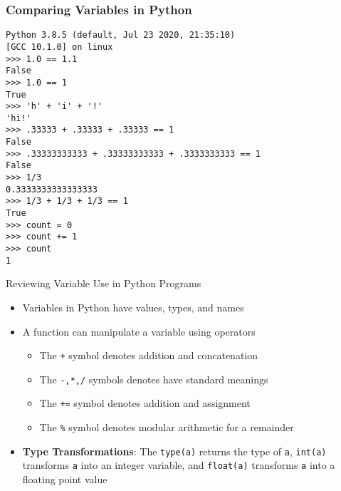\documentclass[14pt,aspectratio=169]{beamer}
\begin{document}
%
\begin{frame}[fragile]
  \frametitle{Comparing Variables in Python}
  \normalsize
  \hspace*{.05in}
  \begin{minipage}{6in}
    \vspace*{-.10in}
    \begin{verbatim}
Python 3.8.5 (default, Jul 23 2020, 21:35:10)
[GCC 10.1.0] on linux
>>> 1.0 == 1.1
False
>>> 1.0 == 1
True
>>> 'h' + 'i' + '!'
'hi!'
>>> .33333 + .33333 + .33333 == 1
False
>>> .33333333333 + .33333333333 + .3333333333 == 1
False
>>> 1/3
0.3333333333333333
>>> 1/3 + 1/3 + 1/3 == 1
True
>>> count = 0
>>> count += 1
>>> count
1
    \end{verbatim}
  \end{minipage}
\end{frame}

%
\begin{frame}{Reviewing Variable Use in Python Programs}
  \begin{itemize}
    \item Variables in Python have values, types, and names
      \vspace*{-.15in}
    \item A function can manipulate a variable using operators
      \begin{itemize}
        \item The {\tt +} symbol denotes addition and concatenation
        \item The {\tt -,*,/} symbols denotes have standard meanings
        \item The {\tt +=} symbol denotes addition and assignment
        \item The {\tt \%} symbol denotes modular arithmetic for a remainder
      \end{itemize}
      \vspace*{-.2in}
    \item {\bf Type Transformations}: The {\tt type(a)} returns the type of
      {\tt a}, {\tt int(a)} transforms {\tt a} into an integer variable, and
      {\tt float(a)} transforms {\tt a} into a floating point value
  \end{itemize}
\end{frame}
\end{document}
